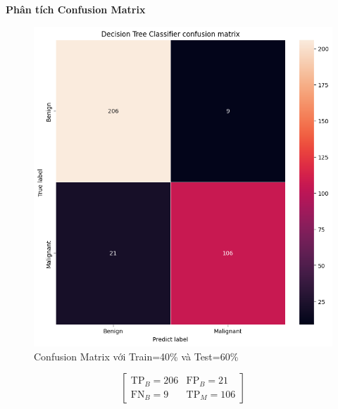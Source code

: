 \newpage

\textbf{Phân tích Confusion Matrix}

\begin{figure}[h!]
	\centering
	\begin{minipage}[b]{0.6\linewidth}
		\centering
		\includegraphics[width=\linewidth]{figures/dataset1/4060.png}
		\caption{Confusion Matrix với Train=40\% và Test=60\%}
		\label{fig:confusion_4060}
	\end{minipage}
\end{figure}

\[
\begin{bmatrix}
	\text{TP}_{B} = 206 & \text{FP}_{B} = 21 \\
	\text{FN}_{B} = 9   & \text{TP}_{M} = 106
\end{bmatrix}
\]

